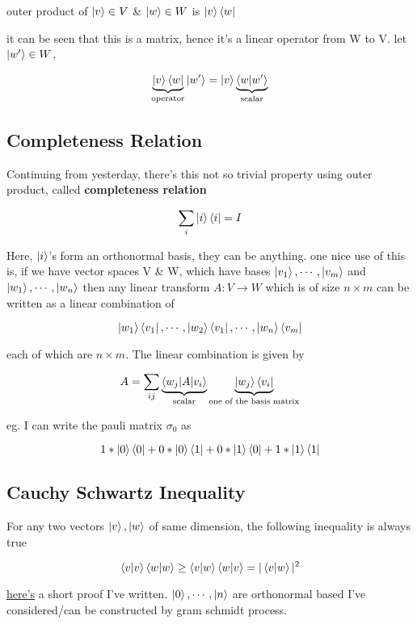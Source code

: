 outer product of $\ket{v} \in V$  \&  $\ket{w} \in W$ is $\ket{v}\bra{w}$

it can be seen that this is a matrix, hence it's a linear operator from W to V. let $\ket{w'} \in W$,

\begin{align*}
\underbrace{\ket{v}\bra{w}}_\text{operator}\ket{w'} =\ket{v} \underbrace{\braket{w|w'}}_\text{scalar}\end{align*}

\subsection{Completeness Relation}
Continuing from yesterday, there's this not so trivial property using outer product, called \textbf{completeness relation}

$$
\sum_i \ket{i}\bra{i} = I
$$

Here, $\ket{i}$’s form an orthonormal basis, they can be anything. one nice use of this is, if we have vector spaces V \& W, which have bases $\ket{v_1},\cdots,\ket{v_m}$ and $\ket{w_1},\cdots,\ket{w_n}$ then any linear transform $A : V \rightarrow W$ which is of size $n \times m$  can be written as a linear combination of 

$$
\ket{w_1}\bra{v_1}, \cdots,\ket{w_2}\bra{v_1},\cdots,\ket{w_n}\bra{v_m}
$$

each of which are $n \times m$. The linear combination is given by

$$
A = \sum_{ij} \underbrace{\braket{w_j|A|v_i}}_{\text{scalar}}\underbrace{\ket{w_j}\bra{v_i}}_{\text{one of the basis matrix}}
$$

eg. I can write the pauli matrix $\sigma_0$  as 

$$
1*\ket{0}\bra{0} + 0 *\ket{0}\bra{1} + \\0*\ket{1}\bra{0} + 1*\ket{1}\bra{1}
$$

\subsection{Cauchy Schwartz Inequality}

For any two vectors $\ket{v}, \ket{w}$ of same dimension, the following inequality is always true

$$
\braket{v|v}\braket{w|w} \geq \braket{v|w}\braket{w|v} = |\braket{v|w}|^2
$$

\href{https://drive.google.com/file/d/1u_q4FOFGTbASSS0xR9YSNNd0d1mMmaXg/view?usp=drive_link}{here's} a short proof I've written. $\ket{0},\cdots,\ket{n}$ are orthonormal based I've considered/can be constructed by gram schmidt process.

